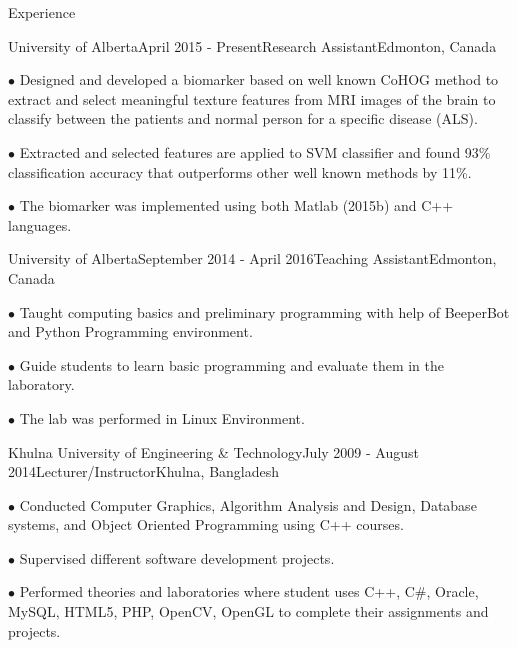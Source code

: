 \documentclass{resume} %
\begin{document}
\begin{rSection}{Experience}

\begin{rSubsection}{University of Alberta}{April 2015 - Present}{Research Assistant}{Edmonton, Canada}
\item[$\bullet$] Designed and developed a biomarker based on well known CoHOG method to extract and select meaningful texture features from MRI images of the brain to classify between the patients and normal person for a specific disease (ALS). 

\item[$\bullet$] Extracted and selected features are applied to SVM classifier and found 93\% classification accuracy that outperforms other well known methods by 11\%.

\item[$\bullet$] The biomarker was implemented using both Matlab (2015b) and C++ languages.
\end{rSubsection}

\begin{rSubsection}{University of Alberta}{September 2014 - April 2016}{Teaching Assistant}{Edmonton, Canada}
\item[$\bullet$] Taught computing basics and preliminary programming with help of BeeperBot and Python Programming environment.

\item[$\bullet$] Guide students to learn basic programming and evaluate them in the laboratory.
\item[$\bullet$] The lab was performed in Linux Environment.
\end{rSubsection}

\begin{rSubsection}{Khulna University of Engineering \& Technology}{July 2009 - August 2014}{Lecturer/Instructor}{Khulna, Bangladesh}
\item[$\bullet$] Conducted Computer Graphics, Algorithm Analysis and Design, Database systems, and Object Oriented Programming using C++ courses. 
\item[$\bullet$] Supervised different software development projects.
\item[$\bullet$] Performed theories and laboratories where student uses C++, C\#, Oracle, MySQL, HTML5, PHP, OpenCV, OpenGL to complete their assignments and projects.
\end{rSubsection}


\end{rSection}
\end{document}
